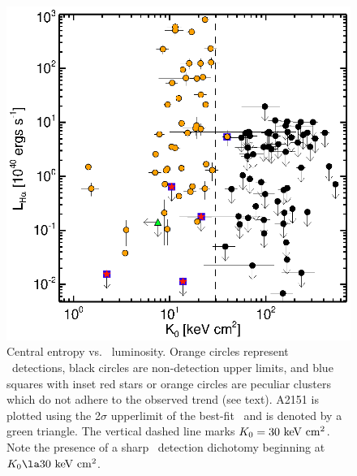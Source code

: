 \documentclass[12pt,preprint]{aastex}
\begin{document}
\clearpage
\begin{figure}
  \begin{center}
    \includegraphics*[width=\columnwidth, trim=28mm 7mm 40mm 17mm, clip]{f1.eps}
    \caption{Central entropy vs. \halpha\ luminosity. Orange circles
      represent \halpha\ detections, black circles are non-detection
      upper limits, and blue squares with inset red stars or orange
      circles are peculiar clusters which do not adhere to the
      observed trend (see text). A2151 is plotted using the 2$\sigma$
      upperlimit of the best-fit \kna\ and is denoted by a green
      triangle. The vertical dashed line marks $K_0 = 30 \mathrm{\mbox{\ensuremath{\mathrm{~keV}}} \mathrm{\mbox{\ensuremath{\mathrm{~cm}}}^2}}$. Note
      the presence of a sharp \halpha\ detection dichotomy beginning
      at $\kna \la 30 \ent$.}
    \label{fig:ha}
  \end{center}
\end{figure}
\end{document}
